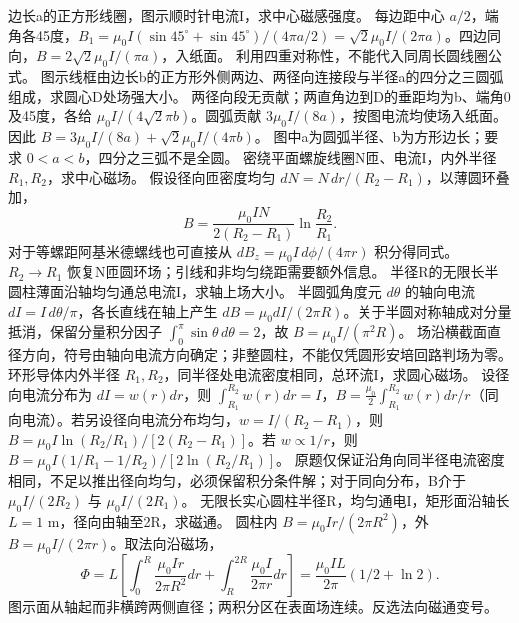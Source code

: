 \problemtext 边长a的正方形线圈，图示顺时针电流I，求中心磁感强度。
\workings 每边距中心 $a/2$，端角各45度，$B_1=\mu_0I(\sin45^\circ+\sin45^\circ)/(4\pi a/2)=\sqrt2\mu_0I/(2\pi a)$。四边同向，$B=2\sqrt2\mu_0I/(\pi a)$，入纸面。
\crosscheck 利用四重对称性，不能代入同周长圆线圈公式。
\problemtext 图示线框由边长b的正方形外侧两边、两径向连接段与半径a的四分之三圆弧组成，求圆心D处场强大小。
\workings 两径向段无贡献；两直角边到D的垂距均为b、端角0及45度，各给 $\mu_0I/(4\sqrt2\pi b)$。圆弧贡献 $3\mu_0I/(8a)$，按图电流均使场入纸面。因此 $B=3\mu_0I/(8a)+\sqrt2\mu_0I/(4\pi b)$。
\crosscheck 图中a为圆弧半径、b为方形边长；要求 $0<a<b$，四分之三弧不是全圆。
\problemtext 密绕平面螺旋线圈N匝、电流I，内外半径 $R_1,R_2$，求中心磁场。
\workings 假设径向匝密度均匀 $dN=N\,dr/(R_2-R_1)$，以薄圆环叠加，
\[
B=\frac{\mu_0IN}{2(R_2-R_1)}\ln\frac{R_2}{R_1}.
\]
对于等螺距阿基米德螺线也可直接从 $dB_z=\mu_0I\,d\phi/(4\pi r)$ 积分得同式。
\crosscheck $R_2\to R_1$ 恢复N匝圆环场；引线和非均匀绕距需要额外信息。
\problemtext 半径R的无限长半圆柱薄面沿轴均匀通总电流I，求轴上场大小。
\workings 半圆弧角度元 $d\theta$ 的轴向电流 $dI=I\,d\theta/\pi$，各长直线在轴上产生 $dB=\mu_0dI/(2\pi R)$。关于半圆对称轴成对分量抵消，保留分量积分因子 $\int_0^\pi\sin\theta\,d\theta=2$，故 $B=\mu_0I/(\pi^2R)$。
\crosscheck 场沿横截面直径方向，符号由轴向电流方向确定；非整圆柱，不能仅凭圆形安培回路判场为零。
\problemtext 环形导体内外半径 $R_1,R_2$，同半径处电流密度相同，总环流I，求圆心磁场。
\workings 设径向电流分布为 $dI=w(r)dr$，则 $\int_{R_1}^{R_2}w(r)dr=I$，$B=\frac{\mu_0}{2}\int_{R_1}^{R_2}w(r)dr/r$（同向电流）。若另设径向电流分布均匀，$w=I/(R_2-R_1)$，则 $B=\mu_0 I\ln(R_2/R_1)/[2(R_2-R_1)]$。若 $w\propto1/r$，则 $B=\mu_0I(1/R_1-1/R_2)/[2\ln(R_2/R_1)]$。
\crosscheck 原题仅保证沿角向同半径电流密度相同，不足以推出径向均匀，必须保留积分条件解；对于同向分布，B介于 $\mu_0I/(2R_2)$ 与 $\mu_0I/(2R_1)$。
\problemtext 无限长实心圆柱半径R，均匀通电I，矩形面沿轴长 $L=1$ m，径向由轴至2R，求磁通。
\workings 圆柱内 $B=\mu_0Ir/(2\pi R^2)$，外 $B=\mu_0I/(2\pi r)$。取法向沿磁场，
\[
\Phi=L\left[\int_0^R\frac{\mu_0Ir}{2\pi R^2}dr+\int_R^{2R}\frac{\mu_0I}{2\pi r}dr\right]
=\frac{\mu_0IL}{2\pi}(1/2+\ln2).
\]
\crosscheck 图示面从轴起而非横跨两侧直径；两积分区在表面场连续。反选法向磁通变号。

